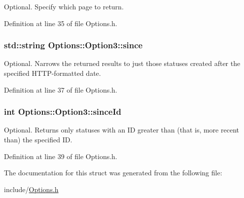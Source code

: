 Optional. Specify which page to return. 



Definition at line 35 of file Options.h.\hypertarget{structOptions_1_1Option3_1be2f3f2fb06e279a8f6c7244903765a}{
\subsubsection{\setlength{\rightskip}{0pt plus 5cm}std::string {\bf Options::Option3::since}}}
\label{structOptions_1_1Option3_1be2f3f2fb06e279a8f6c7244903765a}


Optional. Narrows the returned results to just those statuses created after the specified HTTP-formatted date. 



Definition at line 37 of file Options.h.\hypertarget{structOptions_1_1Option3_1584db69d6254a839da308f1924fc45b}{
\subsubsection{\setlength{\rightskip}{0pt plus 5cm}int {\bf Options::Option3::sinceId}}}
\label{structOptions_1_1Option3_1584db69d6254a839da308f1924fc45b}


Optional. Returns only statuses with an ID greater than (that is, more recent than) the specified ID. 



Definition at line 39 of file Options.h.

The documentation for this struct was generated from the following file:\begin{CompactItemize}
\item 
include/\hyperlink{Options_8h}{Options.h}\end{CompactItemize}
